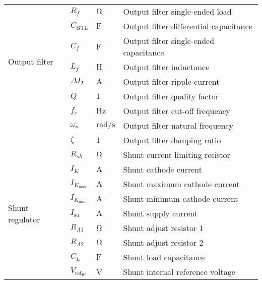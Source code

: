 \begin{longtable}{@{}llll@{}}
	\multirow{7}{*}{Output filter}  & $R_{f}$ & $\si{\ohm}$ & Output filter single-ended load \\
	& $C_{\mathrm{BTL}}$ & $\si{\farad}$ & Output filter differential capacitance \\
	& $C_{f}$ & $\si{\farad}$ & Output filter single-ended capacitance \\
	& $L_{f}$ & $\si{\henry}$ & Output filter inductance \\
	& $\Delta I_{L}$ & $\si{\ampere}$ & Output filter ripple current \\
	& $Q$ & $1$ & Output filter quality factor \\
	& $f_{c}$ & $\si{\hertz}$ & Output filter cut-off frequency \\ 
	& $\omega_{n}$ & $\si{\radian\per\second}$ & Output filter natural frequency \\
	& $\zeta$ & $1$ & Output filter damping ratio \\ \midrule
	\multirow{9}{*}{Shunt regulator}  & $R_{sh}$ & $\si{\ohm}$ & Shunt current limiting resistor \\
	& $I_{K}$ & $\si{\ampere}$ & Shunt cathode current \\
	& $I_{K_{\mathrm{max}}}$ & $\si{\ampere}$ & Shunt maximum cathode current \\
	& $I_{K_{\mathrm{min}}}$ & $\si{\ampere}$ & Shunt minimum cathode current \\
	& $I_{\mathrm{su}}$ & $\si{\ampere}$ & Shunt supply current \\
	& $R_{A1}$ & $\si{\ohm}$ & Shunt adjust resistor 1 \\
	& $R_{A2}$ & $\si{\ohm}$ & Shunt adjust resistor 2 \\
	& $C_{L}$ & $\si{\farad}$ & Shunt load capacitance \\
	& $V_{\mathrm{ref}_{\mathrm{IC}}}$ & \si{\volt} & Shunt internal reference voltage
	\label{tab:denotation}
\end{longtable}
